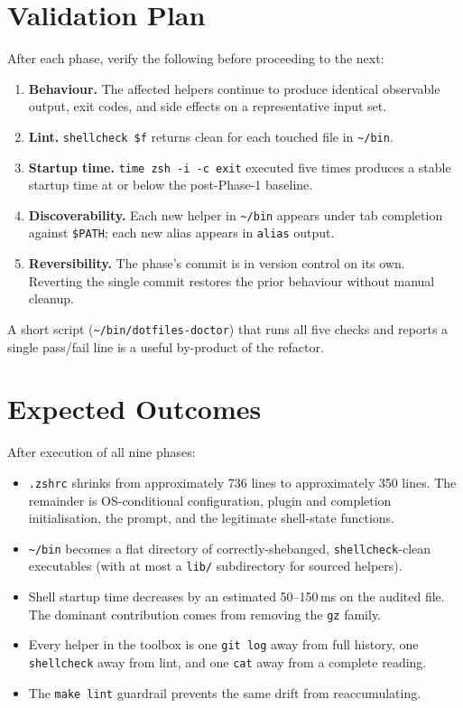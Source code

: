 \documentclass[11pt,letterpaper]{scrartcl}
\begin{document}
\section{Validation Plan}

After each phase, verify the following before proceeding to the
next:

\begin{enumerate}
  \item \textbf{Behaviour.} The affected helpers continue to
        produce identical observable output, exit codes, and
        side effects on a representative input set.
  \item \textbf{Lint.} \texttt{shellcheck \$f} returns clean for
        each touched file in \texttt{\textasciitilde/bin}.
  \item \textbf{Startup time.} \texttt{time zsh -i -c exit}
        executed five times produces a stable startup time at or
        below the post-Phase-1 baseline.
  \item \textbf{Discoverability.} Each new helper in
        \texttt{\textasciitilde/bin} appears under tab completion
        against \texttt{\$PATH}; each new alias appears in
        \texttt{alias} output.
  \item \textbf{Reversibility.} The phase's commit is in version
        control on its own. Reverting the single commit restores
        the prior behaviour without manual cleanup.
\end{enumerate}

A short script (\texttt{\textasciitilde/bin/dotfiles-doctor})
that runs all five checks and reports a single pass/fail line
is a useful by-product of the refactor.

\section{Expected Outcomes}

After execution of all nine phases:

\begin{itemize}
  \item \texttt{.zshrc} shrinks from approximately 736 lines to
        approximately 350 lines. The remainder is OS-conditional
        configuration, plugin and completion initialisation, the
        prompt, and the legitimate shell-state functions.
  \item \texttt{\textasciitilde/bin} becomes a flat directory of
        correctly-shebanged, \texttt{shellcheck}-clean
        executables (with at most a \texttt{lib/} subdirectory
        for sourced helpers).
  \item Shell startup time decreases by an estimated 50--150\,ms
        on the audited file. The dominant contribution comes
        from removing the \texttt{gz} family.
  \item Every helper in the toolbox is one \texttt{git log} away
        from full history, one \texttt{shellcheck} away from
        lint, and one \texttt{cat} away from a complete reading.
  \item The \texttt{make lint} guardrail prevents the same
        drift from reaccumulating.
\end{itemize}
\end{document}
